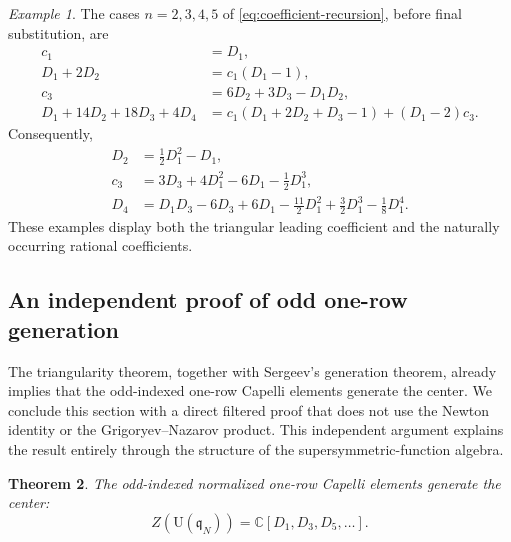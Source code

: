 \documentclass[11pt]{amsart}
\numberwithin{equation}{section}
\newtheorem{theorem}{Theorem}[section]
\theoremstyle{definition}
\theoremstyle{remark}
\newtheorem{example}[theorem]{Example}
\newcommand{\C}{\mathbb C}
\newcommand{\q}{\mathfrak q}
\newcommand{\U}{\mathrm U}
\begin{document}
\begin{example}
The cases \(n=2,3,4,5\) of
\eqref{eq:coefficient-recursion}, before final substitution, are
\begin{align*}
 c_1&=D_1,\\
 D_1+2D_2&=c_1(D_1-1),\\
 c_3&=6D_2+3D_3-D_1D_2,\\
 D_1+14D_2+18D_3+4D_4
 &=c_1(D_1+2D_2+D_3-1)+(D_1-2)c_3.
\end{align*}
Consequently,
\begin{align*}
 D_2&=\frac12D_1^2-D_1,\\
 c_3&=3D_3+4D_1^2-6D_1-\frac12D_1^3,\\
 D_4&=D_1D_3-6D_3+6D_1-\frac{11}{2}D_1^2
      +\frac32D_1^3-\frac18D_1^4.
\end{align*}
These examples display both the triangular leading coefficient and
the naturally occurring rational coefficients.
\end{example}

\subsection{An independent proof of odd one-row generation}\label{subsec:odd-generation}

The triangularity theorem, together with Sergeev's generation theorem,
already implies that the odd-indexed one-row Capelli elements generate
the center.  We conclude this section with a direct filtered proof that
does not use the Newton identity or the Grigoryev--Nazarov product.
This independent argument explains the result entirely through the
structure of the supersymmetric-function algebra.

\begin{theorem}
\label{thm:direct-odd-generation}
The odd-indexed normalized one-row Capelli elements generate the
center:
\[
 Z(\U(\q_N))=\C[D_1,D_3,D_5,\ldots].
\]
\end{theorem}
\end{document}
